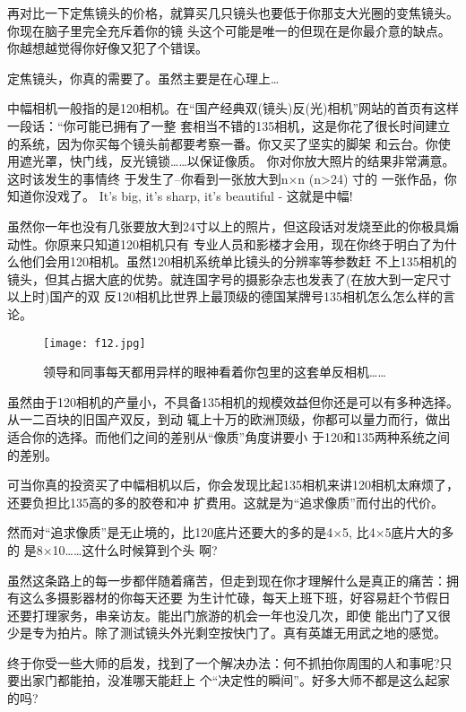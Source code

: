 ﻿\documentclass[12pt,a4paper,onecolumn]{article}
\begin{document}
再对比一下定焦镜头的价格，就算买几只镜头也要低于你那支大光圈的变焦镜头。你现在脑子里完全充斥着你的镜
头这个可能是唯一的但现在是你最介意的缺点。你越想越觉得你好像又犯了个错误。


定焦镜头，你真的需要了。虽然主要是在心理上…

中幅相机一般指的是120相机。在“国产经典双(镜头)反(光)相机”网站的首页有这样一段话：“你可能已拥有了一整
套相当不错的135相机，这是你花了很长时间建立的系统，因为你买每个镜头前都要考察一番。你又买了坚实的脚架
和云台。你使用遮光罩，快门线，反光镜锁……以保证像质。 你对你放大照片的结果非常满意。这时该发生的事情终
于发生了--你看到一张放大到n×n (n>24) 寸的 一张作品，你知道你没戏了。 It's big, it's sharp, it's
beautiful - 这就是中幅!

虽然你一年也没有几张要放大到24寸以上的照片，但这段话对发烧至此的你极具煽动性。你原来只知道120相机只有
专业人员和影楼才会用，现在你终于明白了为什么他们会用120相机。虽然120相机系统单比镜头的分辨率等参数赶
不上135相机的镜头，但其占据大底的优势。就连国字号的摄影杂志也发表了(在放大到一定尺寸以上时)国产的双
反120相机比世界上最顶级的德国某牌号135相机怎么怎么样的言论。

\begin{wrapfigure}{l}{0.3\textwidth}
\vspace{-2ex}
\texttt{[image: f12.jpg]}
\caption{领导和同事每天都用异样的眼神看着你包里的这套单反相机……}
\vspace{-2ex}
\end{wrapfigure}


虽然由于120相机的产量小，不具备135相机的规模效益但你还是可以有多种选择。从一二百块的旧国产双反，到动
辄上十万的欧洲顶级，你都可以量力而行，做出适合你的选择。而他们之间的差别从“像质”角度讲要小
于120和135两种系统之间的差别。

可当你真的投资买了中幅相机以后，你会发现比起135相机来讲120相机太麻烦了，还要负担比135高的多的胶卷和冲
扩费用。这就是为“追求像质”而付出的代价。

然而对“追求像质”是无止境的，比120底片还要大的多的是4×5, 比4×5底片大的多的 是8×10……这什么时候算到个头
啊?

虽然这条路上的每一步都伴随着痛苦，但走到现在你才理解什么是真正的痛苦：拥有这么多摄影器材的你每天还要
为生计忙碌，每天上班下班，好容易赶个节假日还要打理家务，串亲访友。能出门旅游的机会一年也没几次，即使
能出门了又很少是专为拍片。除了测试镜头外光剩空按快门了。真有英雄无用武之地的感觉。

终于你受一些大师的启发，找到了一个解决办法：何不抓拍你周围的人和事呢?只要出家门都能拍，没准哪天能赶上
个“决定性的瞬间”。好多大师不都是这么起家的吗?
\end{document}
